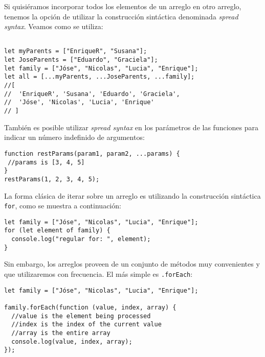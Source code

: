 \documentclass[a4paper, oneside, titlepage, 12pt]{book}
\begin{document}
Si quisiéramos incorporar todos los elementos de un arreglo en otro arreglo, tenemos la opción de utilizar la construcción sintáctica denominada \textit{spread syntax}. Veamos como se utiliza:

\begin{verbatim}

let myParents = ["EnriqueR", "Susana"];
let JoseParents = ["Eduardo", "Graciela"];
let family = ["Jóse", "Nicolas", "Lucia", "Enrique"];
let all = [...myParents, ...JoseParents, ...family];
//[
//  'EnriqueR', 'Susana', 'Eduardo', 'Graciela', 
//  'Jóse', 'Nicolas', 'Lucia', 'Enrique'
// ]
\end{verbatim}

También es posible utilizar \textit{spread syntax} en los parámetros de las funciones para indicar un número indefinido de argumentos:

\begin{verbatim}
function restParams(param1, param2, ...params) {
 //params is [3, 4, 5]	
}
restParams(1, 2, 3, 4, 5);
\end{verbatim}

La forma clásica de iterar sobre un arreglo es utilizando la construcción sintáctica \texttt{for}, como se muestra a continuación: 

\begin{verbatim}
let family = ["Jóse", "Nicolas", "Lucia", "Enrique"];
for (let element of family) {
  console.log("regular for: ", element);
}
\end{verbatim}
               
Sin embargo, los arreglos proveen de un conjunto de métodos muy convenientes y que utilizaremos con frecuencia. El más simple es \texttt{.forEach}:              
\begin{verbatim}
let family = ["Jóse", "Nicolas", "Lucia", "Enrique"];

family.forEach(function (value, index, array) {
  //value is the element being processed
  //index is the index of the current value
  //array is the entire array
  console.log(value, index, array);
});
\end{verbatim}
\end{document}
